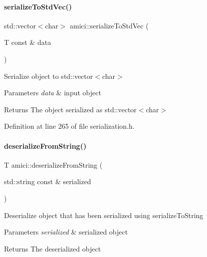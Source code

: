 \mbox{\label{namespaceamici_ad5b38b6ae6007acbaf43521f2a616937}} 
\paragraph{\texorpdfstring{serializeToStdVec()}{serializeToStdVec()}}
{\footnotesize\ttfamily std\+::vector$<$char$>$ amici\+::serialize\+To\+Std\+Vec (\begin{DoxyParamCaption}\item[{T const \&}]{data }\end{DoxyParamCaption})}

Serialize object to std\+::vector$<$char$>$


\begin{DoxyParams}{Parameters}
{\em data} & input object\\
\hline
\end{DoxyParams}
\begin{DoxyReturn}{Returns}
The object serialized as std\+::vector$<$char$>$
\end{DoxyReturn}


Definition at line 265 of file serialization.\+h.

\mbox{\label{namespaceamici_a863d35f9934623bc5f7f409a05fa0d67}} 
\paragraph{\texorpdfstring{deserializeFromString()}{deserializeFromString()}}
{\footnotesize\ttfamily T amici\+::deserialize\+From\+String (\begin{DoxyParamCaption}\item[{std\+::string const \&}]{serialized }\end{DoxyParamCaption})}

Deserialize object that has been serialized using serialize\+To\+String


\begin{DoxyParams}{Parameters}
{\em serialized} & serialized object\\
\hline
\end{DoxyParams}
\begin{DoxyReturn}{Returns}
The deserialized object
\end{DoxyReturn}


